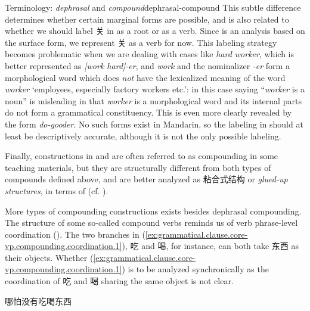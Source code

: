 \documentclass[UTF8, a4paper, oneside, scheme=plain, 12pt]{ctexrep}
\newcommand*{\term}[1]{\emph{#1}}
\newcommand{\form}[1]{\emph{#1}}
\newcommand{\translate}[1]{`#1'}
\begin{document}
\begin{theorybox}{Terminology: \term{dephrasal} and \term{compound}}{dephrasal-compound}
    This subtle difference determines whether certain marginal forms are possible,
    and is also related to whether we should label 关 in  as a root or as a verb.
    Since  is an analysis based on the surface form,
    we represent 关 as a verb for now.
    This labeling strategy becomes problematic 
    when we are dealing with cases like \form{hard worker},
    which is better represented as \form{[work hard]-er},
    and \form{work} and the nominalizer \form{-er} form a morphological word
    which does \emph{not} have the lexicalized meaning of the word \form{worker}
    \translate{employees, especially factory workers etc.}:
    in this case saying ``\form{worker} is a noun''
    is misleading in that \form{worker} is a morphological word
    and its internal parts do not form a grammatical constituency.
    This is even more clearly revealed by the form \form{do-gooder}.
    No such forms exist in Mandarin,
    so the labeling in 
    should at least be descriptively accurate,
    although it is not the only possible labeling.
    
    Finally, constructions in  and  are often referred to as compounding in some teaching materials,
    but they are structurally different from both types of compounds defined above,
    and are better analyzed as 粘合式结构 or \term{glued-up structures},
    in terms of \citet{zhudexigrammar} (cf. ).
\end{theorybox}

More types of compounding constructions exists besides dephrasal compounding.
The structure of some so-called compound verbs reminds us of verb phrase-level coordination ().
The two branches in (\ref{ex:grammatical.clause.core-vp.compounding.coordination.1}), 吃 and 喝,
for instance, can both take 东西 as their objects.
Whether (\ref{ex:grammatical.clause.core-vp.compounding.coordination.1})
is to be analyzed synchronically as the coordination of 吃 and 喝 sharing the same object is not clear.

\begin{exe}
    \ex\label{ex:grammatical.clause.core-vp.compounding.coordination.1} 哪怕没有吃喝东西
\end{exe}
\end{document}
